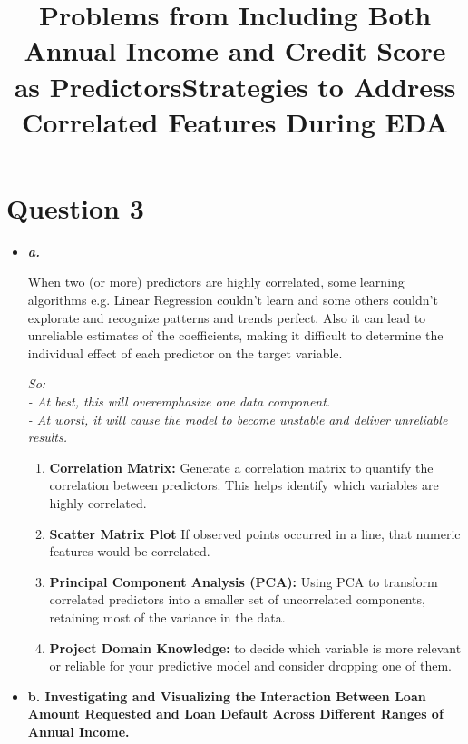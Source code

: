 \documentclass[12pt]{article}
\begin{document}
	\section{Question 3}
		\begin{itemize}
			\item \emph{\textbf{a.}}
			
			\title{\textbf{Problems from Including Both Annual Income and Credit Score as Predictors}}
			When two (or more) predictors are highly correlated, some learning algorithms e.g. Linear Regression couldn't learn and some others couldn't explorate and recognize patterns and trends perfect. Also it can lead to unreliable estimates of the coefficients, making it difficult to determine the individual effect of each predictor on the target variable. 
			
			
			\emph{So: \\
			- At best, this will overemphasize one data component.\\
			- At worst, it will cause the model to become unstable and deliver unreliable results.}
			
			
			\title{\textbf{Strategies to Address Correlated Features During EDA}}
			\begin{enumerate}
			
				\item{\textbf{Correlation Matrix:}}			
				Generate a correlation matrix to quantify the correlation between predictors. This helps identify which variables are highly correlated.
				
				\item{\textbf{Scatter Matrix Plot}} 
				If observed points occurred in a line, that numeric features would be correlated.
				
				\item{\textbf{Principal Component Analysis (PCA):}}
				Using PCA to transform correlated predictors into a smaller set of uncorrelated components, retaining most of the variance in the data.
				
				\item{\textbf{Project Domain Knowledge:}}
				to decide which variable is more relevant or reliable for your predictive model and consider dropping one of them.
			
			\end{enumerate}			



			\item \textbf{b. Investigating and Visualizing the Interaction Between Loan Amount Requested and Loan Default Across Different Ranges of Annual Income.}


\end{itemize}
\end{document}

